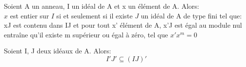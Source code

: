 \begin{maproposition}
	Soient A un anneau, I un idéal de A et x un élément de A. Alors:\\
	$x$ est entier sur $I$ si et seulement si il existe $J$ un idéal de A de type fini tel que: xJ est contenu dans IJ et pour tout x' élément de A, x'J est égal au module nul entraîne qu'il existe m supérieur ou égal à zéro, tel que $x'x^m = 0$
\end{maproposition}
\begin{moncorollaire}
	Soient I, J deux idéaux de A. Alors:
	\[ I'J' \subseteq (IJ)' \]
\end{moncorollaire}
